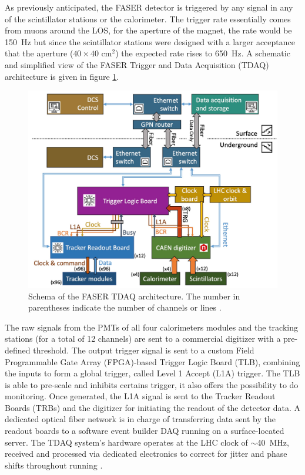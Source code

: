 			 As previously anticipated, the FASER detector is triggered by any signal in any of the scintillator stations or the calorimeter. The trigger rate essentially comes from muons around the LOS, for the aperture of the magnet, the rate would be \SI{150}{\hertz} but since the scintillator stations were designed with a larger acceptance that the aperture ($40\times 40$ cm$^2$) the expected rate rises to \SI{650}{\hertz}. A schematic and simplified view of the FASER Trigger and Data Acquisition (TDAQ) architecture is given in figure \ref{im:FASER_TDAQ}.
			 \begin{figure}[h]
				\centering
				\includegraphics[width=0.8\linewidth]{files/FASER_TDAQ}
				\caption{Schema of the FASER TDAQ architecture. The number in parentheses indicate the number of channels or lines \cite{FASER_Detector}.}
				\label{im:FASER_TDAQ}
			\end{figure}	 
			
			The raw signals from the PMTs of all four calorimeters modules and the tracking stations (for a total of 12 channels) are sent to a commercial digitizer with a pre-defined threshold. The output trigger signal is sent to a custom Field Programmable Gate Array (FPGA)-based Trigger Logic Board (TLB), combining the inputs to form a global trigger, called Level 1 Accept (L1A) trigger. The TLB is able to pre-scale and inhibits certains trigger, it also offers the possibility to do monitoring. Once generated, the L1A signal is sent to the Tracker Readout Boards (TRBs) and the digitizer for initiating the readout of the detector data. A dedicated optical fiber network is in charge of transferring data sent by the readout boards to a software event builder DAQ running on a surface-located server. The TDAQ system's hardware operates at the LHC clock of $\sim$\SI{40}{\mega\hertz}, received and processed via dedicated electronics to correct for jitter and phase shifts throughout running \cite{FASER_Detector}. 
			 
